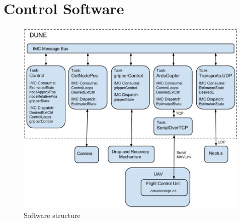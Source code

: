 \chapter{Control Software}
\label{control_SW}
\begin{figure}[H]
\centering
\includegraphics[width = 12cm]{fig/SW.jpg}
\caption{Software structure}
\label{SW}
\end{figure}